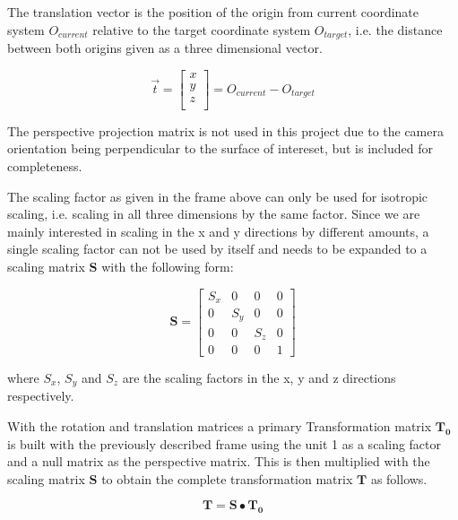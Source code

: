 The translation vector is the position of the origin from current coordinate system $O_{current}$ 
relative to the target coordinate system $O_{target}$, i.e. the distance between both origins given as a three dimensional vector. 

$$
\vec{t} =
\begin{bmatrix}
x\\
y\\
z\\
\end{bmatrix}=
O_{current}-O_{target}
$$

The perspective projection matrix is not used in this project due to the camera orientation being perpendicular to the surface of intereset, but is included for completeness.

The scaling factor as given in the frame above can only be used for isotropic scaling, i.e. scaling in all three dimensions by the same factor. Since we are mainly interested in scaling in the x and y directions by different amounts, a single scaling factor can not be used by itself and needs to be expanded to a scaling matrix $\mathbf{S}$ with the following form:

$$
\mathbf{S}=
\begin{bmatrix}
S_x & 0 & 0   & 0\\
0 & S_y & 0   & 0\\
0 & 0   & S_z & 0\\
0 & 0   & 0   & 1
\end{bmatrix}
$$


where $S_x$, $S_y$ and $S_z$ are the scaling factors in the x, y and z directions respectively.

With the rotation and translation matrices a primary Transformation matrix $\mathbf{T_{0}}$ is built with the previously described frame using the unit 1 as a scaling factor and a null matrix as the perspective matrix. 
This is then multiplied with the scaling matrix $\mathbf{S}$ to obtain the complete transformation matrix $\mathbf{T}$ as follows. 

$$\mathbf{T} =  \mathbf{S} \bullet  \mathbf{T_{0}}$$




